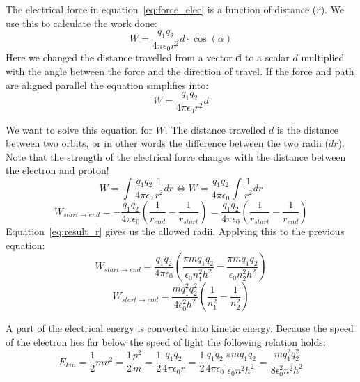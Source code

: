 The electrical force in equation~\ref{eq:force_elec} is a function of distance ($r$). We use this to calculate the work done:
\begin{equation}
W = \frac{q_1 q_2}{4 \pi \epsilon_0 r^2} d \cdot \cos(\alpha) \label{eq:work_elec}
\end{equation}
Here we changed the distance travelled from a vector \textbf{d} to a scalar $d$ multiplied with the angle between the force and the direction of travel. If the force and path are aligned parallel the equation simplifies into:
\begin{equation}
W = \frac{q_1 q_2}{4 \pi \epsilon_0 r^2} d \label{eq:work_elec_2}
\end{equation}

We want to solve this equation for $W$. The distance travelled $d$ is the distance between two orbits, or in other words the difference between the two radii ($dr$). Note that the strength of the electrical force changes with the distance between the electron and proton!
\begin{equation}
W = \int \frac{q_1 q_2}{4 \pi \epsilon_0} \frac{1}{r^2} dr \Leftrightarrow W = \frac{q_1 q_2}{4 \pi \epsilon_0} \int \frac{1}{r^2} dr \label{eq:work_elec_int}
\end{equation}
\begin{equation}
W_{start \rightarrow end} = - \frac{q_1 q_2}{4 \pi \epsilon_0} \left( \frac{1}{r_{end}} - \frac{1}{r_{start}}\right) = \frac{q_1 q_2}{4 \pi \epsilon_0} \left( \frac{1}{r_{start}} - \frac{1}{r_{end}}\right) \label{eq:work_elec_end_start}
\end{equation}
Equation~\ref{eq:result_r} gives us the allowed radii. Applying this to the previous equation:
\begin{equation}
W_{start \rightarrow end} = \frac{q_1 q_2}{4 \pi \epsilon_0} \left( \frac{\pi m q_1 q_2}{ \epsilon_0 n_{1}^2 h^2} - \frac{\pi m q_1 q_2}{\epsilon_0 n_{2}^2 h^2}\right)  \label{eq:work_elec_end_start_r}
\end{equation}
\begin{equation}
W_{start \rightarrow end} = \frac{m q_{1}^2 q_{2}^2}{4 \epsilon_{0}^2 h^2} \left( \frac{1}{n_{1}^2} - \frac{1}{n_{2}^2}\right) \label{eq:work_elec_end_start_r_simplified}
\end{equation}

A part of the electrical energy is converted into kinetic energy. Because the speed of the electron lies far below the speed of light the following relation holds:
\begin{equation}
E_{kin} = \frac{1}{2} mv^2 = \frac{1}{2} \frac{p^2}{m} = \frac{1}{2} \frac{q_1 q_2}{4 \pi \epsilon_0 r} = \frac{1}{2} \frac{q_1 q_2}{4 \pi \epsilon_0} \frac{\pi m q_1 q_2}{\epsilon_0 n^2 h^2}=\frac{m q_{1}^2 q_{2}^2}{8 \epsilon_{0}^2 n^2 h^2}%
\label{eq:E_kin}
\end{equation}

